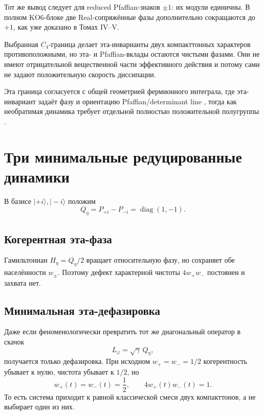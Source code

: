 Тот же вывод следует для reduced Pfaffian-знаков $\pm1$: их модули
единичны. В полном KO6-блоке две Real-сопряжённые фазы дополнительно
сокращаются до $+1$, как уже доказано в Томах IV--V.

\begin{theorem}
Выбранная $C_4$-граница делает эта-инварианты двух компакттонных
характеров противоположными, но эта- и Pfaffian-вклады остаются чистыми
фазами. Они не имеют отрицательной вещественной части эффективного
действия и потому сами не задают положительную скорость диссипации.
\end{theorem}

Эта граница согласуется с общей геометрией фермионного интеграла, где
эта-инвариант задаёт фазу и ориентацию Pfaffian/determinant line
\cite{c4-eta-witten2015}, тогда как необратимая динамика требует отдельной
полностью положительной полугруппы
\cite{c4-eta-gks1976,c4-eta-lindblad1976}.

\section{Три минимальные редуцированные динамики}

В базисе $|+i\rangle,|-i\rangle$ положим
\begin{equation}
 Q_\eta=P_{+i}-P_{-i}=\operatorname{diag}(1,-1).
\end{equation}

\subsection{Когерентная эта-фаза}

Гамильтониан $H_\eta=Q_\eta/2$ вращает относительную фазу, но сохраняет
обе населённости $w_\pm$. Поэтому дефект характерной чистоты
$4w_+w_-$ постоянен и захвата нет.

\subsection{Минимальная эта-дефазировка}

Даже если феноменологически превратить тот же диагональный оператор в
скачок
\begin{equation}
 L_\varphi=\sqrt\gamma\,Q_\eta,
 \end{equation}
получается только дефазировка. При исходном
$w_+=w_-=1/2$ когерентность убывает к нулю, чистота убывает к $1/2$, но
\begin{equation}
 w_+(t)=w_-(t)=\frac12,
 \qquad
 4w_+(t)w_-(t)=1.
\end{equation}
То есть система приходит к равной классической смеси двух компакттонов,
а не выбирает один из них.

